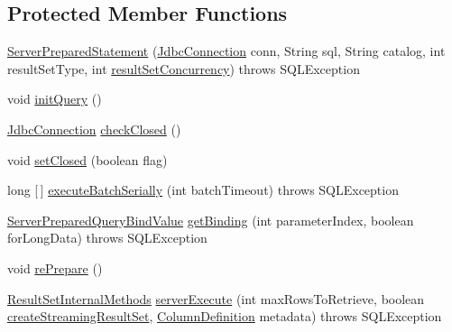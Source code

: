 \subsection*{Protected Member Functions}
\begin{DoxyCompactItemize}
\item 
\mbox{\hyperlink{classcom_1_1mysql_1_1cj_1_1jdbc_1_1_server_prepared_statement_a7ba66017e5f394e2b28838c1bb2509d6}{Server\+Prepared\+Statement}} (\mbox{\hyperlink{interfacecom_1_1mysql_1_1cj_1_1jdbc_1_1_jdbc_connection}{Jdbc\+Connection}} conn, String sql, String catalog, int result\+Set\+Type, int \mbox{\hyperlink{classcom_1_1mysql_1_1cj_1_1jdbc_1_1_statement_impl_a8cf4c2416671121707036791a1cd92b7}{result\+Set\+Concurrency}})  throws S\+Q\+L\+Exception 
\item 
void \mbox{\hyperlink{classcom_1_1mysql_1_1cj_1_1jdbc_1_1_server_prepared_statement_a32fafc3584a50615fbe2ec40da7d4786}{init\+Query}} ()
\item 
\mbox{\hyperlink{interfacecom_1_1mysql_1_1cj_1_1jdbc_1_1_jdbc_connection}{Jdbc\+Connection}} \mbox{\hyperlink{classcom_1_1mysql_1_1cj_1_1jdbc_1_1_server_prepared_statement_a0879d304320cba9dca05b1ac253c069c}{check\+Closed}} ()
\item 
void \mbox{\hyperlink{classcom_1_1mysql_1_1cj_1_1jdbc_1_1_server_prepared_statement_a12594728430be5d936a706ddc26b8864}{set\+Closed}} (boolean flag)
\item 
long \mbox{[}$\,$\mbox{]} \mbox{\hyperlink{classcom_1_1mysql_1_1cj_1_1jdbc_1_1_server_prepared_statement_ad45f1add2950dfa19f88d18796056c02}{execute\+Batch\+Serially}} (int batch\+Timeout)  throws S\+Q\+L\+Exception 
\item 
\mbox{\hyperlink{classcom_1_1mysql_1_1cj_1_1_server_prepared_query_bind_value}{Server\+Prepared\+Query\+Bind\+Value}} \mbox{\hyperlink{classcom_1_1mysql_1_1cj_1_1jdbc_1_1_server_prepared_statement_aea8dc33102ef15790b84b6ebf355452b}{get\+Binding}} (int parameter\+Index, boolean for\+Long\+Data)  throws S\+Q\+L\+Exception 
\item 
void \mbox{\hyperlink{classcom_1_1mysql_1_1cj_1_1jdbc_1_1_server_prepared_statement_a3cf52e5d0562a9bf53b44f162dd78fbf}{re\+Prepare}} ()
\item 
\mbox{\hyperlink{interfacecom_1_1mysql_1_1cj_1_1jdbc_1_1result_1_1_result_set_internal_methods}{Result\+Set\+Internal\+Methods}} \mbox{\hyperlink{classcom_1_1mysql_1_1cj_1_1jdbc_1_1_server_prepared_statement_a47b5b3c9203f0b52a897ca2fa6537ff2}{server\+Execute}} (int max\+Rows\+To\+Retrieve, boolean \mbox{\hyperlink{classcom_1_1mysql_1_1cj_1_1jdbc_1_1_statement_impl_a4a514bb3e111c30e6b376b74bb8f78e8}{create\+Streaming\+Result\+Set}}, \mbox{\hyperlink{interfacecom_1_1mysql_1_1cj_1_1protocol_1_1_column_definition}{Column\+Definition}} metadata)  throws S\+Q\+L\+Exception 

\end{DoxyCompactItemize}
